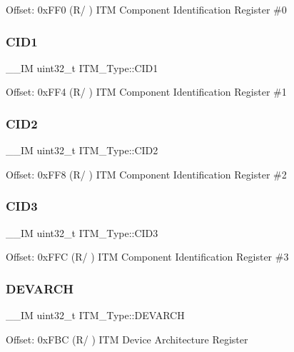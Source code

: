 Offset\+: 0x\+F\+F0 (R/ ) I\+TM Component Identification Register \#0 \mbox{\label{struct_i_t_m___type_ac40df2c3a6cef02f90b4e82c8204756f}} 
\subsubsection{\texorpdfstring{CID1}{CID1}}
{\footnotesize\ttfamily \+\_\+\+\_\+\+IM uint32\+\_\+t I\+T\+M\+\_\+\+Type\+::\+C\+I\+D1}

Offset\+: 0x\+F\+F4 (R/ ) I\+TM Component Identification Register \#1 \mbox{\label{struct_i_t_m___type_a8000b92e4e528ae7ac4cb8b8d9f6757d}} 
\subsubsection{\texorpdfstring{CID2}{CID2}}
{\footnotesize\ttfamily \+\_\+\+\_\+\+IM uint32\+\_\+t I\+T\+M\+\_\+\+Type\+::\+C\+I\+D2}

Offset\+: 0x\+F\+F8 (R/ ) I\+TM Component Identification Register \#2 \mbox{\label{struct_i_t_m___type_a43451f43f514108d9eaed5b017f8d921}} 
\subsubsection{\texorpdfstring{CID3}{CID3}}
{\footnotesize\ttfamily \+\_\+\+\_\+\+IM uint32\+\_\+t I\+T\+M\+\_\+\+Type\+::\+C\+I\+D3}

Offset\+: 0x\+F\+FC (R/ ) I\+TM Component Identification Register \#3 \mbox{\label{struct_i_t_m___type_a2372a4ebb63e36d1eb3fcf83a74fd537}} 
\subsubsection{\texorpdfstring{DEVARCH}{DEVARCH}}
{\footnotesize\ttfamily \+\_\+\+\_\+\+IM uint32\+\_\+t I\+T\+M\+\_\+\+Type\+::\+D\+E\+V\+A\+R\+CH}

Offset\+: 0x\+F\+BC (R/ ) I\+TM Device Architecture Register \mbox{\label{struct_i_t_m___type_ae2ce4d3a54df2fd11a197ccac4406cd0}} 
